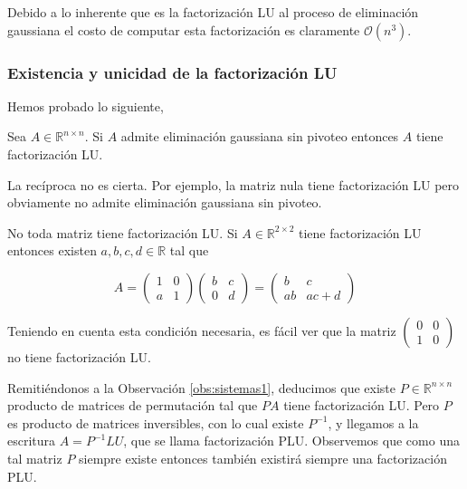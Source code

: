 Debido a lo inherente que es la factorización LU al proceso de eliminación gaussiana el costo de computar esta factorización es claramente $\mathcal{O}(n^3)$.

\subsubsection{Existencia y unicidad de la factorización LU}

Hemos probado lo siguiente,

\begin{propo}
Sea $A \in \mathbb{R}^{n \times n}$. Si $A$ admite eliminación gaussiana sin pivoteo entonces $A$ tiene factorización LU.
\end{propo}

\begin{obs}
La recíproca no es cierta. Por ejemplo, la matriz nula tiene factorización LU pero obviamente no admite eliminación gaussiana sin pivoteo.
\end{obs}

\begin{obs}
No toda matriz tiene factorización LU. Si $A \in \mathbb{R}^{2 \times 2}$ tiene factorización LU entonces existen $a, b, c, d \in \mathbb{R}$ tal que

\[A = \begin{pmatrix}1 & 0\\a & 1\end{pmatrix} \begin{pmatrix}b & c\\0 & d\end{pmatrix} = \begin{pmatrix}
b & c\\ab & ac + d
\end{pmatrix}\]

Teniendo en cuenta esta condición necesaria, es fácil ver que la matriz $\begin{pmatrix}
0 & 0\\1 & 0
\end{pmatrix}$ no tiene factorización LU.

\end{obs}

\begin{obs}
Remitiéndonos a la Observación \ref{obs:sistemas1}, deducimos que existe $P \in \mathbb{R}^{n \times n}$ producto de matrices de permutación tal que $PA$ tiene factorización LU. Pero $P$ es producto de matrices inversibles, con lo cual existe $P^{-1}$, y llegamos a la escritura $A = P^{-1}LU$, que se llama factorización PLU. Observemos que como una tal matriz $P$ siempre existe entonces también existirá siempre una factorización PLU.
\end{obs}

